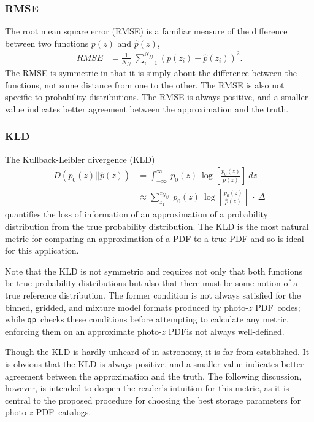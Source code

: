 \documentclass[\docopts]{\docclass}
\newcommand{\qp}{\texttt{qp}}
\newcommand{\pz}{photo-$z$ PDF}
\begin{document}
\subsubsection{RMSE}
\label{sec:rms}


The root mean square error (RMSE) is a familiar measure of the difference 
between two functions $p(z)$ and $\hat{p}(z)$,
\begin{align}
  \label{eq:rmse}
  RMSE &= \frac{1}{N_{ff}}\ \sum_{i=1}^{N_{ff}} (p(z_{i}) - \hat{p}(z_{i}))^{2}.
\end{align}
The RMSE is symmetric in that it is simply about the difference between the 
functions, not some distance from one to the other.  The RMSE is also not 
specific to probability distributions.  The RMSE is always positive, and a 
smaller value indicates better agreement between the approximation and the 
truth.

\subsubsection{KLD}
\label{sec:kld}

The Kullback-Leibler divergence (KLD)
\begin{align}
  \label{eq:kld}
  D(p_{0}(z) || \hat{p}(z)) &= \int_{-\infty}^{\infty}\ p_{0}(z)\ 
\log\left[\frac{p_{0}(z)}{\hat{p}(z)}\right]\ dz\\
  &\approx \sum_{z_{1}}^{z_{N_{ff}}}\ p_{0}(z)\ 
\log\left[\frac{p_{0}(z)}{\hat{p}(z)}\right]\ \cdot\ \Delta
\end{align}
quantifies the loss of information of an approximation of a probability 
distribution from the true probability distribution.  The KLD is the most 
natural metric for comparing an approximation of a PDF to a true PDF and so is 
ideal for this application.

Note that the KLD is not symmetric and requires not only that both functions be 
true probability distributions but also that there must be some notion of a 
true reference distribution.  The former condition is not always satisfied for 
the binned, gridded, and mixture model formats produced by \pz\ codes; while 
\qp\ checks these conditions before attempting to calculate any metric, 
enforcing them on an approximate \pz is not always well-defined.

Though the KLD is hardly unheard of in astronomy, it is far from established.  
It is obvious that the KLD is always positive, and a smaller value indicates 
better agreement between the approximation and the truth.  The following 
discussion, however, is intended to deepen the reader's intuition for this 
metric, as it is central to the proposed procedure for choosing the best 
storage parameters for \pz\ catalogs.
\end{document}
